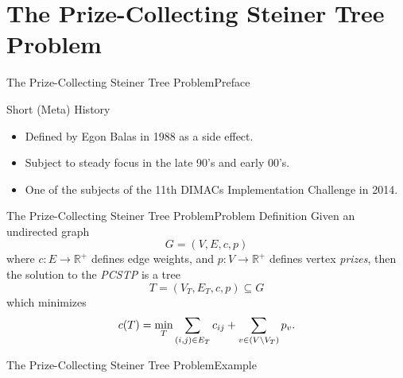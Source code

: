 \documentclass[rgb,dvipsnames]{beamer}
\newcommand{\RR}{\mathbb{R}}      %
\begin{document}
\section{The Prize-Collecting Steiner Tree Problem}
\begin{frame}{The Prize-Collecting Steiner Tree Problem}{Preface}
  \begin{block}{Short (Meta) History}
  \begin{itemize}[<+->]
  \item Defined by Egon Balas in 1988 as a side effect.
  \item Subject to steady focus in the late 90's and early 00's.
  \item One of the subjects of the 11th DIMACs Implementation Challenge in 2014.
  \end{itemize}
  \end{block}
\end{frame}
\begin{frame}{The Prize-Collecting Steiner Tree Problem}{Problem Definition}
 Given an undirected graph
\[G = (V, E, c, p)\]
where $c: E \to \RR^+$ defines edge weights,
and $p: V \to \RR^+$ defines vertex \textit{prizes}, then the solution to the
\textit{PCSTP} is a tree
\[T = (V_T, E_T, c, p) \subseteq G\]
which minimizes
\[c(T) = \min_T \sum_{(i,j) \in E_T} c_{ij} + \sum_{v\in (V \setminus V_T)} p_v \textnormal{.} \]
\end{frame}

\begin{frame}{The Prize-Collecting Steiner Tree Problem}{Example}
  \centering
\end{frame}
\end{document}
